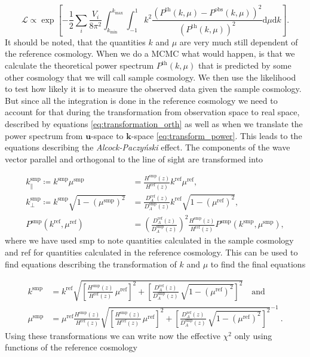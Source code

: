 \documentclass[oneside]{book}
\newcommand*{\rd}{\mathrm{d}}
\begin{document}
 \begin{equation}
    \mathcal{L} \propto \exp\left[-\frac{1}{2} \sum_i \frac{V_i}{8 \pi^2} \int_{k_\mathrm{min}}^{k_\mathrm{max}} \int_{-1}^{1} k^2 \frac{\left(P^\mathrm{th}(k,\mu)-P^\mathrm{obs}(k,\mu)\right)^2}{\left(P^\mathrm{th}(k,\mu)\right)^2} \rd \mu \rd k \right]. 
 \end{equation}
 It should be noted, that the quantities $k$ and $\mu$ are very much still dependent of the reference cosmology. When we do a MCMC what would happen, is that we calculate the theoretical power spectrum $P^\mathrm{th}(k,\mu)$ that is predicted by some other cosmology that we will call sample cosmology. We then use the likelihood to test how likely it is to measure the observed data given the sample cosmology. But since all the integration is done in the reference cosmology we need to account for that during the transformation from observation space to real space, described by equations \ref{eq:transformation_orth} as well as when we translate the power spectrum from $\boldsymbol{u}$-space to $\boldsymbol{k}$-space \ref{eq:transform_power}. This leads to the equations describing the \textit{Alcock-Paczyński} effect. The components of the wave vector parallel and orthogonal to the line of sight are transformed into
 
 \begin{align}
    k_\|^\mathrm{smp} \coloneq k^\mathrm{smp} \mu^\mathrm{smp} &= \frac{H^\mathrm{smp}(z)}{H^\mathrm{ref}(z)} k^\mathrm{ref} \mu^\mathrm{ref}, \nonumber\\
    k_\perp^\mathrm{smp} \coloneq k^\mathrm{smp} \sqrt{1-\left(\mu^\mathrm{smp}\right)^2} &= \frac{D^\mathrm{ref}_A(z)}{D^\mathrm{smp}_A(z)} k^\mathrm{ref} \sqrt{1-\left(\mu^\mathrm{ref}\right)^2}, \nonumber\\
    P^\mathrm{smp}(k^\mathrm{ref},\mu^\mathrm{ref}) &= \left(\frac{D^\mathrm{ref}_A(z)}{D^\mathrm{smp}_A(z)} \right)^2 \frac{H^\mathrm{smp}(z)}{H^\mathrm{ref}(z)} P^\mathrm{smp}(k^\mathrm{smp},\mu^\mathrm{smp}),\label{eq:Alcock-Paczynski}
 \end{align}
where we have used smp to note quantities calculated in the sample cosmology and ref for quantities calculated in the reference cosmology. This can be used to find equations describing the transformation of $k$ and $\mu$ to find the final equations

\begin{align}
    k^\mathrm{smp} &= k^\mathrm{ref} \sqrt{\left[\frac{H^\mathrm{smp}(z)}{H^\mathrm{ref}(z)} \, \mu^\mathrm{ref} \right]^2 + \left[ \frac{D^\mathrm{ref}_A(z)}{D^\mathrm{smp}_A(z)} \, \sqrt{1-\left(\mu^\mathrm{ref}\right)^2} \right]^2 } \quad \text{and} \nonumber\\
    \mu^\mathrm{smp} &= \mu^\mathrm{ref} \frac{H^\mathrm{smp}(z)}{H^\mathrm{ref}(z)} \sqrt{\left[\frac{H^\mathrm{smp}(z)}{H^\mathrm{ref}(z)} \, \mu^\mathrm{ref} \right]^2 + \left[ \frac{D^\mathrm{ref}_A(z)}{D^\mathrm{smp}_A(z)} \, \sqrt{1-\left(\mu^\mathrm{ref}\right)^2} \right]^2 }^{-1}\:. \label{eq:observed_kmu}
\end{align}
Using these transformations we can write now the effective $\chi^2$ only using functions of the reference cosmology
\end{document}
